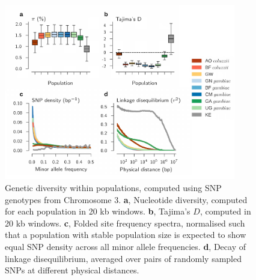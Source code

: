 \begin{refsection}
\begin{figure}[t!]
\centering
\includegraphics[width=0.9\textwidth]{artwork/chapter4/pop_params.pdf}
\caption{Genetic diversity within populations, computed using SNP genotypes from Chromosome 3.
%
\textbf{a}, Nucleotide diversity, computed for each population in 20 kb windows.
%
\textbf{b}, Tajima's $D$, computed in 20 kb windows.
%
\textbf{c}, Folded site frequency spectra, normalised such that a population with stable population size is expected to show equal SNP density across all minor allele frequencies.
%
\textbf{d}, Decay of linkage disequilibrium, averaged over pairs of randomly sampled SNPs at different physical distances.
%
}
\label{fig:diversity}
\end{figure}



\end{refsection}
